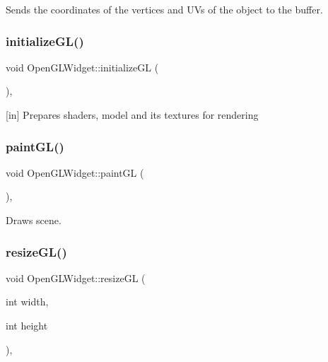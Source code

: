 Sends the coordinates of the vertices and UV\textquotesingle{}s of the object to the buffer. 

\mbox{\label{class_open_g_l_widget_a4baa372aec232a8d6c153cdef540dc11}} 
\subsubsection{initialize\+G\+L()}
{\footnotesize\ttfamily void Open\+G\+L\+Widget\+::initialize\+GL (\begin{DoxyParamCaption}{ }\end{DoxyParamCaption})\hspace{0.3cm}{\ttfamily [override]}, {\ttfamily [protected]}}



[in] Prepares shaders, model and it\textquotesingle{}s textures for rendering 

\mbox{\label{class_open_g_l_widget_a86df33a6b58b77588ffb1c110fcf2932}} 
\subsubsection{paint\+G\+L()}
{\footnotesize\ttfamily void Open\+G\+L\+Widget\+::paint\+GL (\begin{DoxyParamCaption}{ }\end{DoxyParamCaption})\hspace{0.3cm}{\ttfamily [override]}, {\ttfamily [protected]}}



Draws scene. 

\mbox{\label{class_open_g_l_widget_a1bdb72bca1dda9243983c71c8a3e0157}} 
\subsubsection{resize\+G\+L()}
{\footnotesize\ttfamily void Open\+G\+L\+Widget\+::resize\+GL (\begin{DoxyParamCaption}\item[{int}]{width,  }\item[{int}]{height }\end{DoxyParamCaption})\hspace{0.3cm}{\ttfamily [override]}, {\ttfamily [protected]}}



